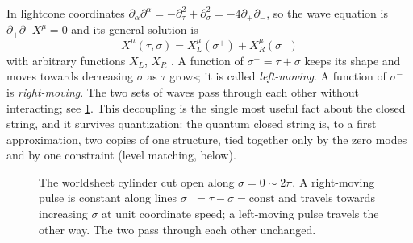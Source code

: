 In lightcone coordinates $\partial_\alpha\partial^\alpha=-\partial_\tau^2+\partial_\sigma^2
=-4\partial_+\partial_-$, so the wave equation is $\partial_+\partial_-X^\mu=0$ and its
general solution is
\begin{equation}\label{eq:classical:LR}
  X^\mu(\tau,\sigma)=X_L^\mu(\sigma^+)+X_R^\mu(\sigma^-)
\end{equation}
with arbitrary functions $X_L$, $X_R$ . A function of
$\sigma^+=\tau+\sigma$ keeps its shape and moves towards decreasing $\sigma$ as $\tau$ grows;
it is called \emph{left-moving}. A function of $\sigma^-$
is \emph{right-moving}. The two sets of waves pass through each other without interacting;
see \cref{fig:classical:movers}. This decoupling is the single most useful fact about the
closed string, and it survives quantization: the quantum closed string is, to a first
approximation, two copies of one structure, tied together only by the zero modes and by one
constraint (level matching, below).

\begin{figure}[t]
\centering
{}
\caption{The worldsheet cylinder cut open along $\sigma=0\sim2\pi$. A right-moving pulse is
constant along lines $\sigma^-=\tau-\sigma=\text{const}$ and travels towards increasing
$\sigma$ at unit coordinate speed; a left-moving pulse travels the other way. The two pass
through each other unchanged.}
\label{fig:classical:movers}
\end{figure}

